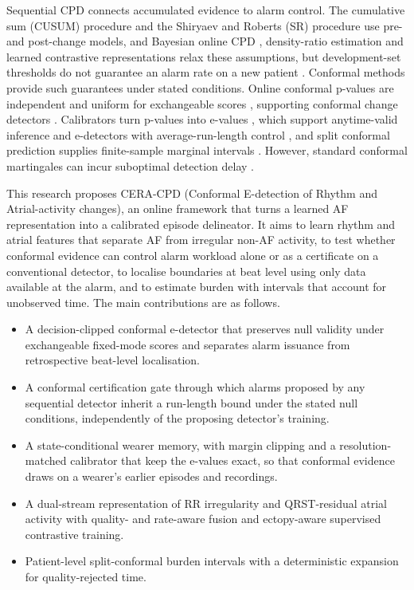 \documentclass[preprint,12pt]{elsarticle}
\newcommand{\method}{CERA-CPD}
\newcommand{\1}{\mathbf{1}}
\begin{document}
Sequential CPD connects accumulated evidence to alarm control. The cumulative sum (CUSUM) procedure \cite{page1954} and the Shiryaev and Roberts (SR) procedure \cite{shiryaev1963,roberts1966} use pre- and post-change models, and Bayesian online CPD \cite{adams2007bocpd}, density-ratio estimation \cite{liu2013rulsif} and learned contrastive representations \cite{deldari2021tscp2} relax these assumptions, but development-set thresholds do not guarantee an alarm rate on a new patient \cite{gupta2024review}. Conformal methods provide such guarantees under stated conditions. Online conformal p-values are independent and uniform for exchangeable scores \cite{vovk2003testing,vovk2022alrw}, supporting conformal change detectors \cite{volkhonskiy2017icm,vovk2025cusum}. Calibrators turn p-values into e-values \cite{vovk2021evalues}, which support anytime-valid inference \cite{ramdas2023savi} and e-detectors with average-run-length control \cite{shin2024edetectors}, and split conformal prediction supplies finite-sample marginal intervals \cite{lei2018split}. However, standard conformal martingales can incur suboptimal detection delay \cite{bhattacharyya2026conformal}.

This research proposes \method{} (Conformal E-detection of Rhythm and Atrial-activity changes), an online framework that turns a learned AF representation into a calibrated episode delineator. It aims to learn rhythm and atrial features that separate AF from irregular non-AF activity, to test whether conformal evidence can control alarm workload alone or as a certificate on a conventional detector, to localise boundaries at beat level using only data available at the alarm, and to estimate burden with intervals that account for unobserved time. The main contributions are as follows.

\begin{itemize}
\item A decision-clipped conformal e-detector that preserves null validity under exchangeable fixed-mode scores and separates alarm issuance from retrospective beat-level localisation.
\item A conformal certification gate through which alarms proposed by any sequential detector inherit a run-length bound under the stated null conditions, independently of the proposing detector's training.
\item A state-conditional wearer memory, with margin clipping and a resolution-matched calibrator that keep the e-values exact, so that conformal evidence draws on a wearer's earlier episodes and recordings.
\item A dual-stream representation of RR irregularity and QRST-residual atrial activity with quality- and rate-aware fusion and ectopy-aware supervised contrastive training.
\item Patient-level split-conformal burden intervals with a deterministic expansion for quality-rejected time.
\end{itemize}
\end{document}
